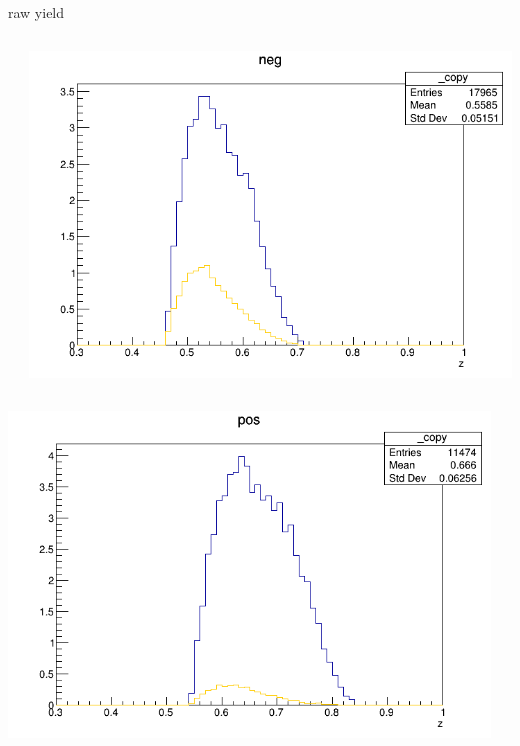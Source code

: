\begin{frame}{raw yield}
\begin{columns}
\begin{column}[T]{0.25\textwidth}
\end{column}
\begin{column}[T]{0.25\textwidth}
\includegraphics[width = \textwidth]{results/yield/statistics/yield_x_Q2_z_0.55_5.500_0.55_neg.png}
\end{column}
\end{columns}
\begin{columns}
\begin{column}[T]{0.25\textwidth}
\includegraphics[width = \textwidth]{results/yield/statistics/yield_x_Q2_z_0.55_5.500_0.65_pos.png}
\end{column}
\begin{column}[T]{0.25\textwidth}

\end{column}
\end{columns}
\end{frame}
